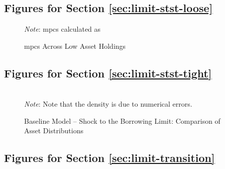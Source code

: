 \documentclass[12pt]{article} %
\numberwithin{equation}{section} %
\numberwithin{figure}{section}
\numberwithin{table}{section}
\begin{document}
\begin{refsection}
\begin{appendices}
\subsection{Figures for Section \ref{sec:limit-stst-loose}}
\label{sec-app:figures-limit-loose}

\begin{figure}[H]
    \centering
    \caption{\Gls{mpc}s Across Low Asset Holdings}
    \label{fig:baseline-limit-initial-mpcs}
    

    \vspace{10pt}
    
    \begin{minipage}{0.75\textwidth} %
    \footnotesize
    \textit{Note}: \Gls{mpc}s calculated as
    \end{minipage}
\end{figure}

\subsection{Figures for Section \ref{sec:limit-stst-tight}}
\label{sec-app:figures-limit-tight}

\begin{sidewaysfigure}
    \caption{Baseline Model -- Shock to the Borrowing Limit: Comparison
 of Asset Distributions}
    \label{fig:comparison-stst-baseline-dist}
    \centering

    \\
     \centering
	\textit{Note}: Note that the density is due to numerical errors.
\end{sidewaysfigure}

\subsection{Figures for Section \ref{sec:limit-transition}}
\label{sec-app:figures-limit-transition}


\end{appendices}
\end{refsection}
\end{document}
